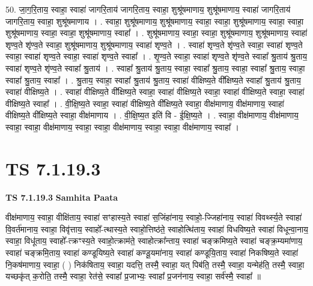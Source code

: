 \documentclass[17pt]{extarticle}
\begin{document}
50. जा॒ग॒रि॒ताय॒ स्वाहा॒ स्वाहा॑ जागरि॒ताय॑ जागरि॒ताय॒ स्वाहा॒ शुश्रू॑षमाणाय॒ शुश्रू॑षमाणाय॒ स्वाहा॑ जागरि॒ताय॑ जागरि॒ताय॒ स्वाहा॒ शुश्रू॑षमाणाय । . स्वाहा॒ शुश्रू॑षमाणाय॒ शुश्रू॑षमाणाय॒ स्वाहा॒ स्वाहा॒ शुश्रू॑षमाणाय॒ स्वाहा॒ स्वाहा॒ शुश्रू॑षमाणाय॒ स्वाहा॒ स्वाहा॒ शुश्रू॑षमाणाय॒ स्वाहा᳚ । . शुश्रू॑षमाणाय॒ स्वाहा॒ स्वाहा॒ शुश्रू॑षमाणाय॒ शुश्रू॑षमाणाय॒ स्वाहा॑ शृण्व॒ते शृ॑ण्व॒ते स्वाहा॒ शुश्रू॑षमाणाय॒ शुश्रू॑षमाणाय॒ स्वाहा॑ शृण्व॒ते । . स्वाहा॑ शृण्व॒ते शृ॑ण्व॒ते स्वाहा॒ स्वाहा॑ शृण्व॒ते स्वाहा॒ स्वाहा॑ शृण्व॒ते स्वाहा॒ स्वाहा॑ शृण्व॒ते स्वाहा᳚ । . शृ॒ण्व॒ते स्वाहा॒ स्वाहा॑ शृण्व॒ते शृ॑ण्व॒ते स्वाहा᳚ श्रु॒ताय॑ श्रु॒ताय॒ स्वाहा॑ शृण्व॒ते शृ॑ण्व॒ते स्वाहा᳚ श्रु॒ताय॑ । . स्वाहा᳚ श्रु॒ताय॑ श्रु॒ताय॒ स्वाहा॒ स्वाहा᳚ श्रु॒ताय॒ स्वाहा॒ स्वाहा᳚ श्रु॒ताय॒ स्वाहा॒ स्वाहा᳚ श्रु॒ताय॒ स्वाहा᳚ । . श्रु॒ताय॒ स्वाहा॒ स्वाहा᳚ श्रु॒ताय॑ श्रु॒ताय॒ स्वाहा॑ वीक्षिष्य॒ते वी᳚क्षिष्य॒ते स्वाहा᳚ श्रु॒ताय॑ श्रु॒ताय॒ स्वाहा॑ वीक्षिष्य॒ते । . स्वाहा॑ वीक्षिष्य॒ते वी᳚क्षिष्य॒ते स्वाहा॒ स्वाहा॑ वीक्षिष्य॒ते स्वाहा॒ स्वाहा॑ वीक्षिष्य॒ते स्वाहा॒ स्वाहा॑ वीक्षिष्य॒ते स्वाहा᳚ । . वी॒क्षि॒ष्य॒ते स्वाहा॒ स्वाहा॑ वीक्षिष्य॒ते वी᳚क्षिष्य॒ते स्वाहा॒ वीक्ष॑माणाय॒ वीक्ष॑माणाय॒ स्वाहा॑ वीक्षिष्य॒ते वी᳚क्षिष्य॒ते स्वाहा॒ वीक्ष॑माणाय । . वी॒क्षि॒ष्य॒त इति॑ वि - ई॒क्षि॒ष्य॒ते । . स्वाहा॒ वीक्ष॑माणाय॒ वीक्ष॑माणाय॒ स्वाहा॒ स्वाहा॒ वीक्ष॑माणाय॒ स्वाहा॒ स्वाहा॒ वीक्ष॑माणाय॒ स्वाहा॒ स्वाहा॒ वीक्ष॑माणाय॒ स्वाहा᳚ । \newline
\pagebreak
{}

\section{ TS 7.1.19.3 }

\textbf{TS 7.1.19.3 } \newline
\textbf{Samhita Paata} \newline

वीक्ष॑माणाय॒ स्वाहा॒ वीक्षि॑ताय॒ स्वाहा॑ सꣳहास्य॒ते स्वाहा॑ स॒जिंहा॑नाय॒ स्वाहो॒-ज्जिहा॑नाय॒ स्वाहा॑ विवर्थ्स्य॒ते स्वाहा॑ वि॒वर्त॑मानाय॒ स्वाहा॒ विवृ॑त्ताय॒ स्वाहो᳚-त्थास्य॒ते स्वाहो॒त्तिष्ठ॑ते॒ स्वाहोत्थि॑ताय॒ स्वाहा॑ विधविष्य॒ते स्वाहा॑ विधून्वा॒नाय॒ स्वाहा॒ विधू॑ताय॒ स्वाहो᳚-त्क्रꣳस्य॒ते स्वाहो॒त्क्राम॑ते॒ स्वाहोत्क्रा᳚न्ताय॒ स्वाहा॑ चङ्क्रमिष्य॒ते स्वाहा॑ चङ्क्र॒म्यमा॑णाय॒ स्वाहा॑ चङ्क्रमि॒ताय॒ स्वाहा॑ कण्डूयिष्य॒ते स्वाहा॑ कण्डू॒यमा॑नाय॒ स्वाहा॑ कण्डूयि॒ताय॒ स्वाहा॑ निकषिष्य॒ते स्वाहा॑ नि॒कष॑माणाय॒ स्वाहा॒ ( ) निक॑षिताय॒ स्वाहा॒ यदत्ति॒ तस्मै॒ स्वाहा॒ यत् पिब॑ति॒ तस्मै॒ स्वाहा॒ यन्मेह॑ति॒ तस्मै॒ स्वाहा॒ यच्छकृ॑त् क॒रोति॒ तस्मै॒ स्वाहा॒ रेत॑से॒ स्वाहा᳚ प्र॒जाभ्यः॒ स्वाहा᳚ प्र॒जन॑नाय॒ स्वाहा॒ सर्व॑स्मै॒ स्वाहा᳚ ॥ \newline
\end{document}
